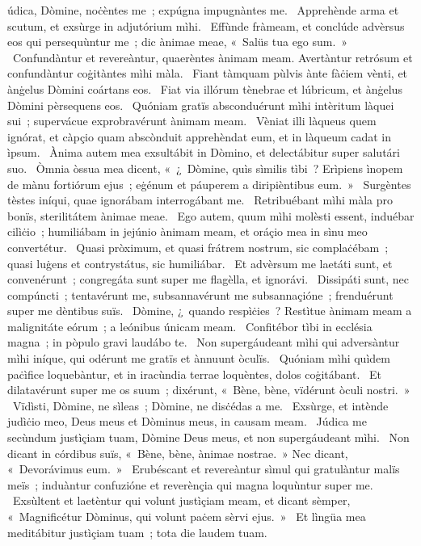 { }
{%
údica, Dòmine, noċèntes me~; expúgna impugnàntes me. 
~Apprehènde arma et scutum, et exsùrge in adjutórium mìhi. 
~Effùnde fràmeam, et conclúde advèrsus eos qui persequùntur me~; dic ànimae meae, «~Salüs tua ego sum.~»
~Confundàntur et revereàntur, quaerèntes ànimam meam. Avertàntur retrósum et confundàntur coġitàntes mìhi màla. 
~Fiant tàmquam pùlvis ànte fàċiem vènti, et ànġelus Dòmini coártans eos. 
~Fiat via illórum tènebrae et lúbricum, et ànġelus Dòmini pèrsequens eos. 
~Quóniam gratïs absconduérunt mìhi intèritum làquei sui~; supervácue exprobravérunt ànimam meam. 
~Vèniat illi làqueus quem ignórat, et càpçio quam abscònduit apprehèndat eum, et in làqueum cadat in ìpsum. 
~Ànima autem mea exsultábit in Dòmino, et delectábitur super salutári suo. 
~Òmnia òssua mea dicent, «~¿~Dòmine, quìs sìmilis tìbi~? Erìpiens ìnopem de mànu fortiórum ejus~; eġénum et páuperem a diripièntibus eum.~» 
~Surgèntes tèstes iníqui, quae ignorábam interrogábant me. 
~Retribuébant mìhi màla pro bonïs, sterilitátem ànimae meae. 
~Ego autem, quum mìhi molèsti essent, induébar cilìċio~; humiliábam in jejúnio ànimam meam, et oráçio mea in sìnu meo convertétur. 
~Quasi pròximum, et quasi frátrem nostrum, sic complaċébam~; quasi luġens et contrystátus, sic humiliábar. 
~Et advèrsum me laetáti sunt, et convenérunt~; congregáta sunt super me flagèlla, et ignorávi. 
~Dissipáti sunt, nec compúncti~; tentavérunt me, subsannavérunt me subsannaçióne~; frenduérunt super me dèntibus suïs. 
~Dòmine, ¿~quando respìċies~? Restìtue ànimam meam a malignitáte eórum~; a leónibus únicam meam. 
~Confitébor tìbi in ecclésia magna~; in pòpulo gravi laudábo te. 
~Non supergáudeant mìhi qui adversàntur mìhi iníque, qui odérunt me gratïs et ànnuunt òculïs. 
~Quóniam mìhi quìdem paċìfice loquebàntur, et in iracùndia terrae loquèntes, dolos coġitábant. 
~Et dilatavérunt super me os suum~; dixérunt, «~Bène, bène, vïdérunt òculi nostri.~»
~Vïdìsti, Dòmine, ne sìleas~; Dòmine, ne disċédas a me. 
~Exsùrge, et intènde judìċio meo, Deus meus et Dòminus meus, in causam meam. 
~Júdica me secùndum justìçiam tuam, Dòmine Deus meus, et non supergáudeant mìhi. 
~Non dicant in córdibus suïs, «~Bène, bène, ànimae nostrae.~» Nec dicant, «~Devorávimus eum.~»
~Erubéscant et revereàntur sìmul qui gratulàntur malïs meïs~; induàntur confuzióne et reverènçia qui magna loquùntur super me. 
~Exsùltent et laetèntur qui volunt justìçiam meam, et dicant sèmper, «~Magnificétur Dòminus, qui volunt paċem sèrvi ejus.~»
~Et lìngüa mea meditábitur justìçiam tuam~; tota die laudem tuam. 
}

